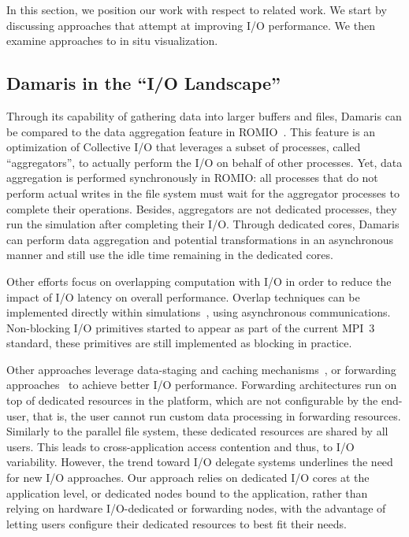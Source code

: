 In this section, we position our work with respect to related work.
We start by discussing approaches that attempt at improving I/O performance.
We then examine approaches to in situ visualization.

\subsection{Damaris in the ``I/O Landscape''}

Through its capability of gathering data into larger buffers and files, 
Damaris can be compared to the data aggregation 
feature in ROMIO~\cite{thakur1999data}. This feature is an optimization of
Collective I/O that leverages a subset of processes, called ``aggregators'', to
actually perform the I/O on behalf of other processes.
Yet, data aggregation is performed synchronously in ROMIO:
all processes that do not perform actual writes in the file system must
wait for the aggregator processes to complete their operations. Besides,
aggregators are not dedicated processes, they run the simulation after completing their I/O.
Through dedicated cores, Damaris can perform data aggregation 
and potential transformations in an asynchronous
manner and still use the idle time remaining in the dedicated cores.

Other efforts focus on overlapping computation with I/O in order
to reduce the impact of I/O latency on overall performance. Overlap
techniques can be implemented directly within
simulations~\cite{patrick2008comparative}, using asynchronous
communications. Non-blocking I/O primitives started to appear as
part of the current MPI~3 standard, these primitives are still implemented as blocking in practice. 

Other approaches leverage data-staging and caching
mechanisms~\cite{nisar2009scaling,isaila2010design}, or
forwarding approaches~\cite{ali2009scalable} to achieve better I/O
performance. Forwarding architectures run on top of dedicated
resources in the platform, which are not configurable by the end-user, that is,
the user cannot run custom data processing in forwarding resources.
Similarly to the parallel file system, these dedicated resources are shared by all users. 
This leads to cross-application access contention and thus, to I/O variability. 
However, the trend toward I/O delegate systems underlines the need for new I/O approaches. 
Our approach relies on dedicated I/O cores at the
application level, or dedicated nodes bound to the application, 
rather than relying on hardware I/O-dedicated or forwarding
nodes, with the advantage of letting users configure their dedicated resources
to best fit their needs.

